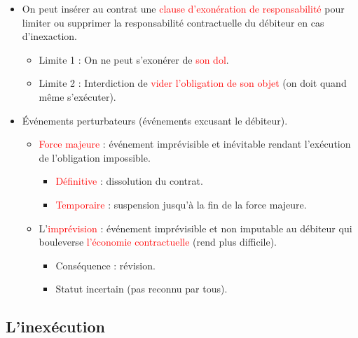 \begin{itemize}
\begin{itemize}
\begin{itemize}
		\end{itemize}
		\item On peut insérer au contrat une \textcolor{red}{clause d'exonération de responsabilité} pour limiter ou supprimer la responsabilité contractuelle du débiteur en cas d'inexaction.
		\begin{itemize}
			\item Limite 1 : On ne peut s'exonérer de \textcolor{red}{son dol}.
			\item Limite 2 : Interdiction de \textcolor{red}{vider l'obligation de son objet} (on doit quand même s'exécuter).
		\end{itemize}
		\item Événements perturbateurs (événements excusant le débiteur).
		\begin{itemize}
			\item \textcolor{red}{Force majeure} : événement imprévisible et inévitable rendant l'exécution de l'obligation impossible.
			\begin{itemize}
				\item \textcolor{red}{Définitive} : dissolution du contrat.
				\item \textcolor{red}{Temporaire} : suspension jusqu'à la fin de la force majeure.
			\end{itemize}
			\item L'\textcolor{red}{imprévision} : événement imprévisible et non imputable au débiteur qui bouleverse \textcolor{red}{l'économie contractuelle} (rend plus difficile).
			\begin{itemize}
				\item Conséquence : révision.
				\item Statut incertain (pas reconnu par tous).
			\end{itemize}
		\end{itemize}
	\end{itemize}
\end{itemize}

\subsection{L'inexécution}

